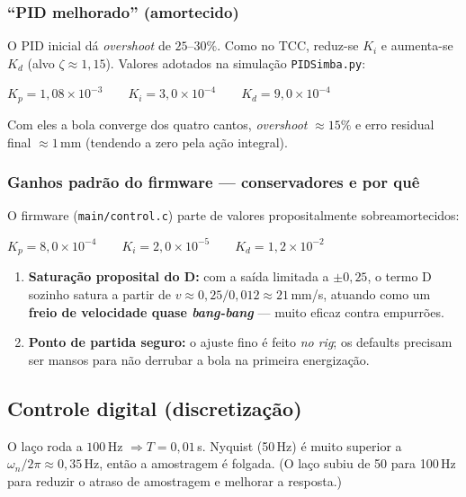 \documentclass[11pt,a4paper,oneside]{article}
\begin{document}
\subsubsection{``PID melhorado'' (amortecido)}

O PID inicial dá \emph{overshoot} de $25$–$30\%$. Como no TCC, reduz-se $K_i$ e
aumenta-se $K_d$ (alvo $\zeta\approx 1{,}15$). Valores adotados na simulação
\texttt{PIDSimba.py}:

\begin{keybox}
$K_p = 1{,}08\times10^{-3} \qquad K_i = 3{,}0\times10^{-4} \qquad K_d = 9{,}0\times10^{-4}$
\end{keybox}

Com eles a bola converge dos quatro cantos, \emph{overshoot} $\approx 15\%$ e
erro residual final $\approx 1$\,mm (tendendo a zero pela ação integral).

\subsubsection{Ganhos padrão do firmware — conservadores e por quê}

O firmware (\texttt{main/control.c}) parte de valores propositalmente
sobreamortecidos:

\begin{keybox}
$K_p = 8{,}0\times10^{-4} \qquad K_i = 2{,}0\times10^{-5} \qquad K_d = 1{,}2\times10^{-2}$
\end{keybox}

\begin{enumerate}
  \item \textbf{Saturação proposital do D:} com a saída limitada a $\pm0{,}25$, o
  termo D sozinho satura a partir de $v\approx 0{,}25/0{,}012\approx 21$\,mm/s,
  atuando como um \textbf{freio de velocidade quase \emph{bang-bang}} — muito
  eficaz contra empurrões.
  \item \textbf{Ponto de partida seguro:} o ajuste fino é feito \emph{no rig}; os
  defaults precisam ser mansos para não derrubar a bola na primeira energização.
\end{enumerate}

\subsection{Controle digital (discretização)}

O laço roda a $100$\,Hz $\Rightarrow T = 0{,}01$\,s. Nyquist (50\,Hz) é muito
superior a $\omega_n/2\pi\approx 0{,}35$\,Hz, então a amostragem é folgada. (O laço
subiu de 50 para 100\,Hz para reduzir o atraso de amostragem e melhorar a resposta.)
\end{document}

